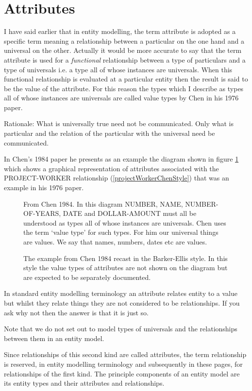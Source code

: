 

\section{Attributes}
\label{Attributes}
\mynote I have said earlier that in entity modelling, the term attribute is adopted as a specific term meaning a relationship between a particular on the one hand and a universal on the other. Actually it would be more accurate to say that the term attribute is used for a \textit{functional} relationship between a type of particulars and a type of universals i.e. a type all of whose instances are universals. When this functional relationship is evaluated at a particular entity then the result is said to be the value of the attribute. For this reason the types which I describe as types all of whose instances are universals are called value types by Chen in his  1976 paper.

\mynote Rationale: What is universally true need not be communicated. Only what is particular and the relation of the particular with the universal need be communicated. 

\mynote
In Chen's 1984 paper he presents as an example the diagram shown in figure 
\ref{AttributesExampleFromChen1984} which shows a graphical representation of attributes associated with the PROJECT-WORKER relationship (\ref{projectWorkerChenStyle}) that was an example in his 1976 paper.
\begin{figure}

\caption{From Chen 1984. In this diagram NUMBER, NAME, NUMBER-OF-YEARS, DATE and DOLLAR-AMOUNT must all be understood as types all of whose instances are universals. Chen uses the term `value type' for such types. For him our universal things are values. We  say that names, numbers, dates etc are values.}
\label{AttributesExampleFromChen1984}
\end{figure}

\begin{figure}

\caption{The example from Chen 1984 recast in the Barker-Ellis style. In this style the value types of attributes are not shown on the diagram but are expected to be 
separately documented. }
\label{projectWorkerAttributesOurStyle}
\end{figure}

\mynote
In standard entity modelling terminology an attribute relates entity to a value but whilst they relate things they are not considered to be relationships. If you ask why not then the answer is that it is just so.
 
\mynote Note that we do not set out to model types of universals and the relationships between them in an entity model. 

\mynote Since relationships of this second kind are called attributes, the term relationship is reserved, in entity modelling terminology and subsequently in these pages, for relationships of the first kind.  The principle components of an entity model are its entity types and their attributes and relationships.


 

